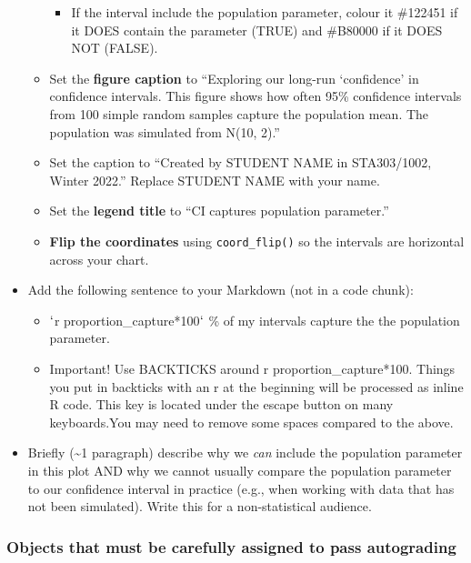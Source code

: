 \documentclass[
  openany]{book}
\providecommand{\tightlist}{%
  \setlength{\itemsep}{0pt}\setlength{\parskip}{0pt}}
\begin{document}
\begin{itemize}
\begin{itemize}
    \begin{itemize}
    \tightlist
    \item
      If the interval include the population parameter, colour it \#122451 if it DOES contain the parameter (TRUE) and \#B80000 if it DOES NOT (FALSE).
    \end{itemize}
  \item
    Set the \textbf{figure caption} to ``Exploring our long-run `confidence' in confidence intervals. This figure shows how often 95\% confidence intervals from 100 simple random samples capture the population mean. The population was simulated from N(10, 2).''
  \item
    Set the caption to ``Created by STUDENT NAME in STA303/1002, Winter 2022.'' Replace STUDENT NAME with your name.
  \item
    Set the \textbf{legend title} to ``CI captures population parameter.''
  \item
    \textbf{Flip the coordinates} using \texttt{coord\_flip()} so the intervals are horizontal across your chart.
  \end{itemize}
\item
  Add the following sentence to your Markdown (not in a code chunk):

  \begin{itemize}
  \item
    \(`\)r proportion\_capture*100\(`\) \% of my intervals capture the the population parameter.
  \item
    Important! Use BACKTICKS around r proportion\_capture*100. Things you put in backticks with an r at the beginning will be processed as inline R code. This key is located under the escape button on many keyboards.You may need to remove some spaces compared to the above.
  \end{itemize}
\item
  Briefly (\textasciitilde1 paragraph) describe why we \emph{can} include the population parameter in this plot AND why we cannot usually compare the population parameter to our confidence interval in practice (e.g., when working with data that has not been simulated). Write this for a non-statistical audience.
\end{itemize}

\hypertarget{objects-that-must-be-carefully-assigned-to-pass-autograding-1}{%
\subsubsection{Objects that must be carefully assigned to pass autograding}\label{objects-that-must-be-carefully-assigned-to-pass-autograding-1}}
\end{document}
